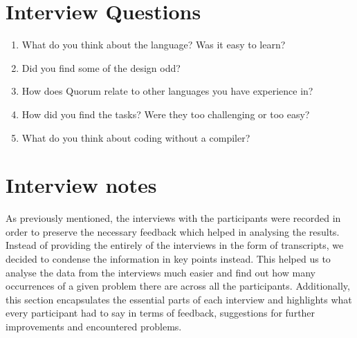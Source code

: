 \chapter{Interview Questions}
\label{chapter:InterviewQuestions}
\begin{enumerate}
\item What do you think about the language? Was it easy to learn?
\item Did you find some of the design odd?
\item How does Quorum relate to other languages you have experience in?
\item How did you find the tasks? Were they too challenging or too easy?
\item What do you think about coding without a compiler?
\end{enumerate}	

\chapter{Interview notes}
\label{chapter:Interview notes}
As previously mentioned, the interviews with the participants were recorded in order to preserve the necessary feedback which helped in analysing the results. Instead of providing the entirely of the interviews in the form of transcripts, we decided to condense the information in key points instead. This helped us to analyse the data from the interviews much easier and find out how many occurrences of a given problem there are across all the participants. Additionally, this section encapsulates the essential parts of each interview and highlights what every participant had to say in terms of feedback, suggestions for further improvements and encountered problems.

